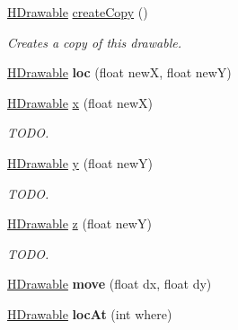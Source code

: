 \begin{DoxyCompactItemize}
\item 
\hyperlink{classhype_1_1core_1_1drawable_1_1_h_drawable}{H\-Drawable} \hyperlink{classhype_1_1core_1_1drawable_1_1_h_stage_a1133314946b11f9ff2008a4fa4dfd49e}{create\-Copy} ()
\begin{DoxyCompactList}\small\item\em Creates a copy of this drawable. \end{DoxyCompactList}\item 
\hypertarget{classhype_1_1core_1_1drawable_1_1_h_stage_a935031858d09241c5d5102402fea2ed3}{\hyperlink{classhype_1_1core_1_1drawable_1_1_h_drawable}{H\-Drawable} {\bfseries loc} (float new\-X, float new\-Y)}\label{classhype_1_1core_1_1drawable_1_1_h_stage_a935031858d09241c5d5102402fea2ed3}

\item 
\hyperlink{classhype_1_1core_1_1drawable_1_1_h_drawable}{H\-Drawable} \hyperlink{classhype_1_1core_1_1drawable_1_1_h_stage_a40c96e01d80934ec54a3d816155af657}{x} (float new\-X)
\begin{DoxyCompactList}\small\item\em T\-O\-D\-O. \end{DoxyCompactList}\item 
\hyperlink{classhype_1_1core_1_1drawable_1_1_h_drawable}{H\-Drawable} \hyperlink{classhype_1_1core_1_1drawable_1_1_h_stage_a7d42de97ce129b1a563a04f993f3b4de}{y} (float new\-Y)
\begin{DoxyCompactList}\small\item\em T\-O\-D\-O. \end{DoxyCompactList}\item 
\hyperlink{classhype_1_1core_1_1drawable_1_1_h_drawable}{H\-Drawable} \hyperlink{classhype_1_1core_1_1drawable_1_1_h_stage_adb901ada9c13a79bfb69621f39f2b8ec}{z} (float new\-Y)
\begin{DoxyCompactList}\small\item\em T\-O\-D\-O. \end{DoxyCompactList}\item 
\hypertarget{classhype_1_1core_1_1drawable_1_1_h_stage_ae53aae5fef1912b31816edce4efcad24}{\hyperlink{classhype_1_1core_1_1drawable_1_1_h_drawable}{H\-Drawable} {\bfseries move} (float dx, float dy)}\label{classhype_1_1core_1_1drawable_1_1_h_stage_ae53aae5fef1912b31816edce4efcad24}

\item 
\hypertarget{classhype_1_1core_1_1drawable_1_1_h_stage_a7fb9cfa38223648ff70c40961f5ef9ac}{\hyperlink{classhype_1_1core_1_1drawable_1_1_h_drawable}{H\-Drawable} {\bfseries loc\-At} (int where)}\label{classhype_1_1core_1_1drawable_1_1_h_stage_a7fb9cfa38223648ff70c40961f5ef9ac}


\end{DoxyCompactItemize}
